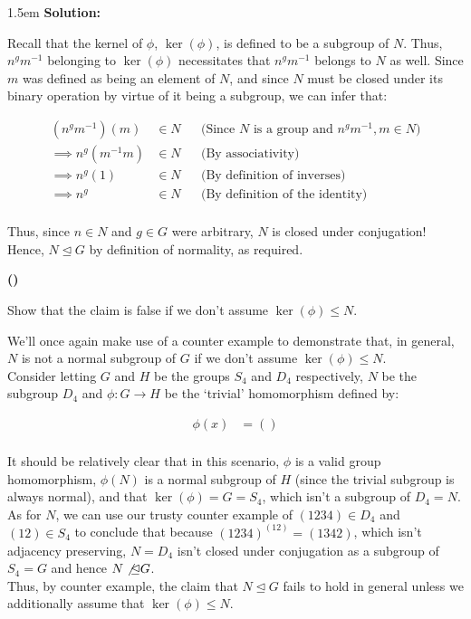 \documentclass{article}
\newenvironment{solution}{
	\vspace{.5em}
	\par
	\begin{adjustwidth}{1.5em}{}
	\textbf{{Solution:}}
	\par
	\vspace{.5em}
}{
	\vspace{1em}
	\end{adjustwidth}
	\setcounter{step}{0}
	\newpage
}
\newcounter{step}
\renewcommand{\thestep}{\Roman{step}}
\newenvironment{step}{
	\refstepcounter{step}
	\vspace{1em}\par\noindent
	\ignorespaces\noindent\textbf{(\thestep)}
	\ignorespaces
}{
	\par
	\vspace{1.5em}
}
\begin{document}
\begin{solution}
	Recall that the kernel of $\phi$, $\ker(\phi)$, is defined to be a subgroup of $N$. Thus, $n^{g}m^{-1}$ belonging to $\ker(\phi)$ necessitates that $n^{g}m^{-1}$ belongs to $N$ as well. Since $m$ was defined as being an element of $N$, and since $N$ must be closed under its binary operation by virtue of it being a subgroup, we can infer that:

	\begin{align*}
		(n^{g}m^{-1})(m) &\in N &&\text{(Since $N$ is a group and $n^{g}m^{-1}, m \in N$)} \\
		\implies n^{g}(m^{-1}{m}) &\in N &&\text{(By associativity)} \\
		\implies n^{g}(1) &\in N &&\text{(By definition of inverses)} \\
		\implies n^{g} &\in N &&\text{(By definition of the identity)} \\
	\end{align*}
	
	Thus, since $n \in N$ and $g \in G$ were arbitrary, $N$ is closed under conjugation! Hence, $N \unlhd G$ by definition of normality, as required.

	\begin{step}
		Show that the claim is false if we don't assume $\ker(\phi) \le N$.
	\end{step}

	We'll once again make use of a counter example to demonstrate that, in general, $N$ is not a normal subgroup of $G$ if we don't assume $\ker(\phi) \le N$. \\

	Consider letting $G$ and $H$ be the groups $S_{4}$ and $D_{4}$ respectively, $N$ be the subgroup $D_{4}$ and $\phi \colon G \rightarrow H$ be the `trivial' homomorphism defined by:

	\begin{align*}
		\phi(x) &= () \\
	\end{align*}

	It should be relatively clear that in this scenario, $\phi$ is a valid group homomorphism, $\phi(N)$ is a normal subgroup of $H$ (since the trivial subgroup is always normal), and that $\ker(\phi) = G = S_{4}$, which isn't a subgroup of $D_{4} = N$. \\

	As for $N$, we can use our trusty counter example of $(1234) \in D_{4}$ and $(12) \in S_{4}$ to conclude that because $(1234)^{(12)} = (1342)$, which isn't adjacency preserving, $N = D_{4}$ isn't closed under conjugation as a subgroup of $S_{4} = G$ and hence $N \not\unlhd G$. \\

	Thus, by counter example, the claim that $N \unlhd G$ fails to hold in general unless we additionally assume that $\ker(\phi) \le N$.
\end{solution}
\end{document}
